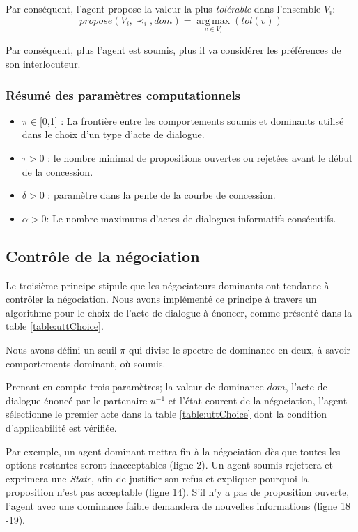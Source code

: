 	\noindent
	Par conséquent, l'agent propose la valeur la plus \emph{tolérable} dans l'ensemble $V_i$:
	\begin{equation}
	propose(V_i, \prec_i,dom) =  \operatorname*{arg\,max}_{v \in V_i} ( tol(v))
	\end{equation}
	
	Par conséquent, plus l'agent est soumis, plus il va considérer les préférences de son interlocuteur.
	
	\subsubsection*{Résumé des paramètres computationnels}
	\begin{itemize}[noitemsep]
		
		\item $\pi \in $[0,1] : La frontière entre  les comportements soumis et dominants utilisé dans le choix d'un type d'acte de dialogue.
		\item $\tau > 0$ : le nombre minimal de propositions ouvertes ou rejetées avant le début de la concession.
		\item $\delta > 0$ : paramètre dans la pente de la courbe de concession.
		\item $\alpha> 0$: Le nombre maximums d'actes de dialogues informatifs consécutifs.
	\end{itemize}
	
	\subsection{Contrôle de la négociation}
	\label{chp4:controle}
	
	Le troisième principe stipule que les négociateurs dominants ont tendance à contrôler la négociation.
	Nous avons implémenté ce principe à travers un algorithme pour le choix de l'acte de dialogue à énoncer, comme présenté dans la table \ref{table:uttChoice}.
	
	Nous avons défini un seuil $\pi$  qui divise le spectre de dominance en deux, à savoir comportements dominant, où soumis.
	
	Prenant en compte trois paramètres; la valeur de dominance $dom$, l'acte de dialogue énoncé par le partenaire $u^{-1}$ et l'état courent de la négociation, l'agent sélectionne le premier acte dans la table \ref{table:uttChoice} dont la condition d'applicabilité est vérifiée.  
	
	
	Par exemple, un agent dominant mettra fin à la négociation dès que toutes les options restantes seront inacceptables (ligne 2). Un agent soumis rejettera et exprimera une \emph{State}, afin de justifier son refus et expliquer pourquoi la proposition n'est pas acceptable (ligne 14). S'il n'y a pas de proposition ouverte, l'agent avec une dominance faible demandera de nouvelles informations (ligne 18 -19).
	
